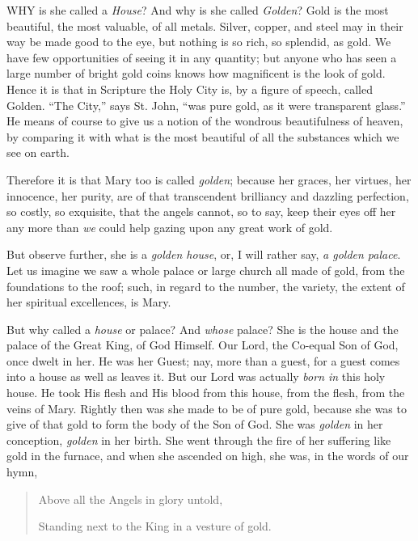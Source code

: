 

WHY
is she called a \emph{House}? And why is she called \emph{Golden}? Gold
is the most beautiful, the most valuable, of all metals. Silver, copper,
and steel may in their way be made good to the eye, but nothing is so
rich, so splendid, as gold. We have few opportunities of seeing it in
any quantity; but anyone who has seen a large number of bright gold
coins knows how magnificent is the look of gold. Hence it is that in
Scripture the Holy City is, by a figure of speech, called Golden. ``The
City,'' says St. John, ``was pure gold, as it were transparent glass.'' He
means of course to give us a notion of the wondrous beautifulness of
heaven, by comparing it with what is the most beautiful of all the
substances which we see on earth.

Therefore it is that Mary too is
called \emph{golden}; because her graces, her virtues, her innocence,
her purity, are of that transcendent brilliancy and dazzling perfection,
so costly, so exquisite, that the angels cannot, so to say, keep
their eyes off her any more than \emph{we} could help gazing upon any
great work of gold.

But observe further, she is a \emph{golden
house}, or, I will rather say, \emph{a golden palace}. Let us imagine
we saw a whole palace or large church all made of gold, from the
foundations to the roof; such, in regard to the number, the variety, the
extent of her spiritual excellences, is Mary.

But why called a \emph{house} or
palace? And \emph{whose} palace? She is the house and the palace of the
Great King, of God Himself. Our Lord, the Co-equal Son of God, once
dwelt in her. He was her Guest; nay, more than a guest, for a guest
comes into a house as well as leaves it. But our Lord was actually \emph{born
in} this holy house. He took His flesh and His blood from this house,
from the flesh, from the veins of Mary. Rightly then was she made to be
of pure gold, because she was to give of that gold to form the body of
the Son of God. She was \emph{golden} in her conception, \emph{golden}
in her birth. She went through the fire of her suffering like gold in
the furnace, and when she ascended on high, she was, in the words of our
hymn,

\begin{quote}

Above all the Angels in glory
untold,

Standing next to the King in a vesture of gold.

\end{quote}

